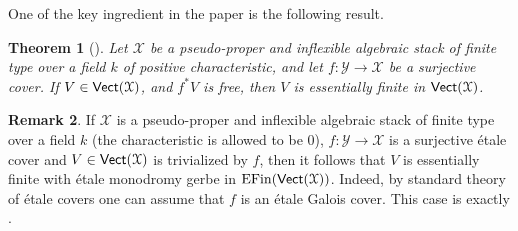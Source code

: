 \documentclass[12pt,reqno]{amsart}
\theoremstyle{plain}
\newtheorem{thm}{Theorem}[section]
\theoremstyle{definition}
\newtheorem{rmk}[thm]{Remark}
\numberwithin{thm}{section}
\newcounter{x}\setcounter{x}{1}
\theoremstyle{plain}
\begin{document}
One of the key ingredient in the paper is the following result.

\begin{thm}[{\cite[Corollary I]{TZ2}}]\label{key thm}
Let ${\mathcal{X}}$ be a pseudo-proper and inflexible algebraic stack of finite type over a field $k$ of
positive characteristic, and let $f\colon {\mathcal{Y}}{\longrightarrow} {\mathcal{X}}$ be a surjective cover. If
$V\in {\text{\sf Vect}}({\mathcal{X}})$, and $f^*V$ is free, then $V$ is essentially finite in ${\text{\sf Vect}}({\mathcal{X}})$.
\end{thm}

\begin{rmk}\label{key thm for torsors}
 If ${\mathcal{X}}$ is a pseudo-proper and inflexible algebraic stack of finite type over a
field $k$ (the characteristic is allowed to be $0$), $f\colon {\mathcal{Y}}{\longrightarrow} {\mathcal{X}}$ is a surjective
\'etale cover and $V\in {\text{\sf Vect}}({\mathcal{X}})$ is trivialized by $f$, then it follows that $V$ is
essentially finite with \'etale monodromy gerbe in ${{\rm EFin}}({\text{\sf Vect}}({\mathcal{X}}))$. Indeed, by standard
theory of \'etale covers one can assume that $f$ is an \'etale Galois cover. This case is
exactly \cite[Lemma 1.4]{TZ3}.
\end{rmk}
\end{document}
